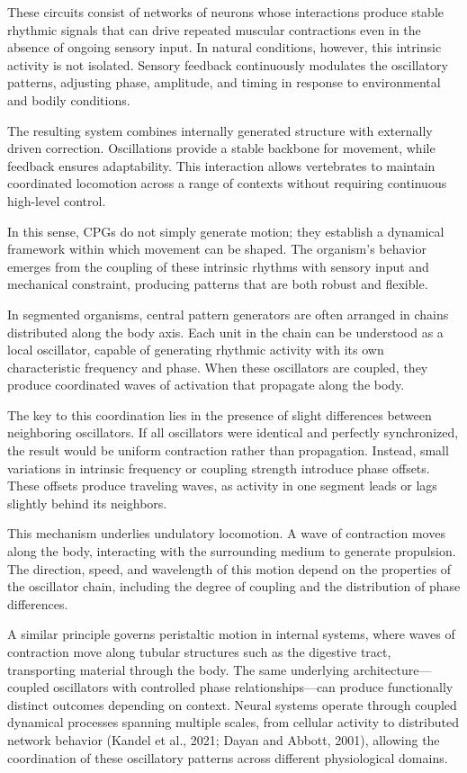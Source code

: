 \documentclass[11pt,oneside]{book}
\begin{document}
These circuits consist of networks of neurons whose interactions produce stable rhythmic signals that can drive repeated muscular contractions even in the absence of ongoing sensory input. In natural conditions, however, this intrinsic activity is not isolated. Sensory feedback continuously modulates the oscillatory patterns, adjusting phase, amplitude, and timing in response to environmental and bodily conditions.

The resulting system combines internally generated structure with externally driven correction. Oscillations provide a stable backbone for movement, while feedback ensures adaptability. This interaction allows vertebrates to maintain coordinated locomotion across a range of contexts without requiring continuous high-level control.

In this sense, CPGs do not simply generate motion; they establish a dynamical framework within which movement can be shaped. The organism’s behavior emerges from the coupling of these intrinsic rhythms with sensory input and mechanical constraint, producing patterns that are both robust and flexible.

In segmented organisms, central pattern generators are often arranged in chains distributed along the body axis. Each unit in the chain can be understood as a local oscillator, capable of generating rhythmic activity with its own characteristic frequency and phase. When these oscillators are coupled, they produce coordinated waves of activation that propagate along the body.

The key to this coordination lies in the presence of slight differences between neighboring oscillators. If all oscillators were identical and perfectly synchronized, the result would be uniform contraction rather than propagation. Instead, small variations in intrinsic frequency or coupling strength introduce phase offsets. These offsets produce traveling waves, as activity in one segment leads or lags slightly behind its neighbors.

This mechanism underlies undulatory locomotion. A wave of contraction moves along the body, interacting with the surrounding medium to generate propulsion. The direction, speed, and wavelength of this motion depend on the properties of the oscillator chain, including the degree of coupling and the distribution of phase differences.

A similar principle governs peristaltic motion in internal systems, where waves of contraction move along tubular structures such as the digestive tract, transporting material through the body. The same underlying architecture—coupled oscillators with controlled phase relationships—can produce functionally distinct outcomes depending on context. Neural systems operate through coupled dynamical processes spanning multiple scales, from cellular activity to distributed network behavior (Kandel et al., 2021; Dayan and Abbott, 2001), allowing the coordination of these oscillatory patterns across different physiological domains.
\end{document}
